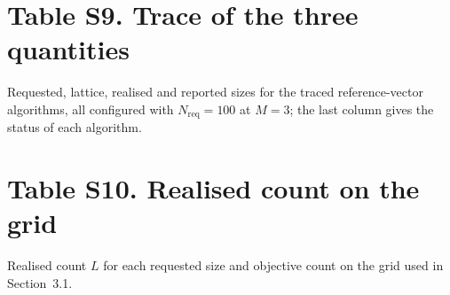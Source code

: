 \documentclass[11pt]{article}
\begin{document}
\clearpage
\section{Table S9. Trace of the three quantities}


Requested, lattice, realised and reported sizes for the traced reference-vector algorithms, all configured with $N_{\mathrm{req}}=100$ at $M=3$; the last column gives the status of each algorithm.

\clearpage
\section{Table S10. Realised count on the grid}


Realised count $L$ for each requested size and objective count on the grid used in Section~3.1.
\end{document}
